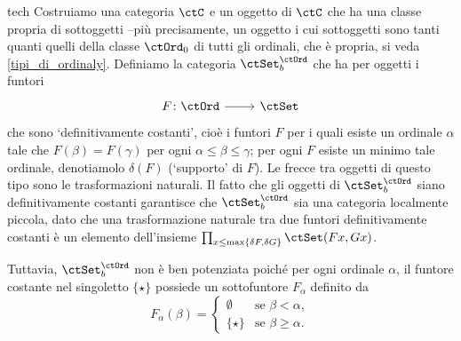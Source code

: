 \begin{hExample}{tech}
 Costruiamo una categoria \(\ctC\) e un oggetto di \(\ctC\) che ha una classe propria di sottoggetti --più precisamente, un oggetto i cui sottoggetti sono tanti quanti quelli della classe \(\ctOrd_0\) di tutti gli ordinali, che è propria, si veda \ref{tipi_di_ordinaly}. Definiamo la categoria \(\ctSet^\ctOrd_b\) che ha per oggetti i funtori
 \[\dmFun{F}{\ctOrd}{\ctSet}\]
 che sono `definitivamente costanti', cioè i funtori \(F\) per i quali esiste un ordinale \(\alpha\) tale che \(F(\beta) = F(\gamma)\) per ogni \(\alpha \leq \beta \leq \gamma\); per ogni \(F\) esiste un minimo tale ordinale, denotiamolo \(\delta(F)\) (`supporto' di \(F\)). Le frecce tra oggetti di questo tipo sono le trasformazioni naturali.
 Il fatto che gli oggetti di \(\ctSet^\ctOrd_b\) siano definitivamente costanti garantisce che \(\ctSet^\ctOrd_b\) sia una categoria localmente piccola, dato che una trasformazione naturale tra due funtori definitivamente costanti è un elemento dell'insieme \(\prod_{x\le\max\{\delta F,\delta G\}} \Hom{\ctSet}(Fx,Gx)\).

 Tuttavia, \(\ctSet^\ctOrd_b\) non è ben potenziata poiché per ogni ordinale \(\alpha\), il funtore costante nel singoletto \(\{\star\}\) possiede un sottofuntore \(F_\alpha\) definito da
 \[
  F_\alpha(\beta)=
  \begin{cases}
   \emptyset & \text{se } \beta<\alpha,    \\
   \{\star\} & \text{se } \beta\geq\alpha.
  \end{cases}
 \]
\end{hExample}
